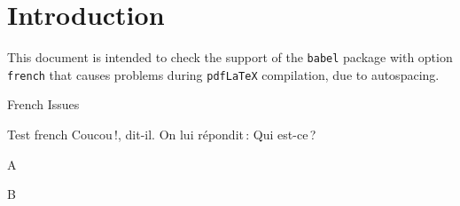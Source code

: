\documentclass{article}
\begin{document}
\section*{Introduction}

This document is intended to check the support of the \texttt{babel} package 
with option \texttt{french} that causes problems during \texttt{pdfLaTeX} 
compilation, due to autospacing.

\begin{quiz}[points=1]{French Issues}
\NoAutoSpacing %

\begin{multi}[feedback={test}]{Test french}
\og Coucou\,!\fg, dit-il. On lui r\'epondit\,: \og Qui est-ce\,?\fg
\item* A
\item B
\end{multi}

\end{quiz}
\end{document}
